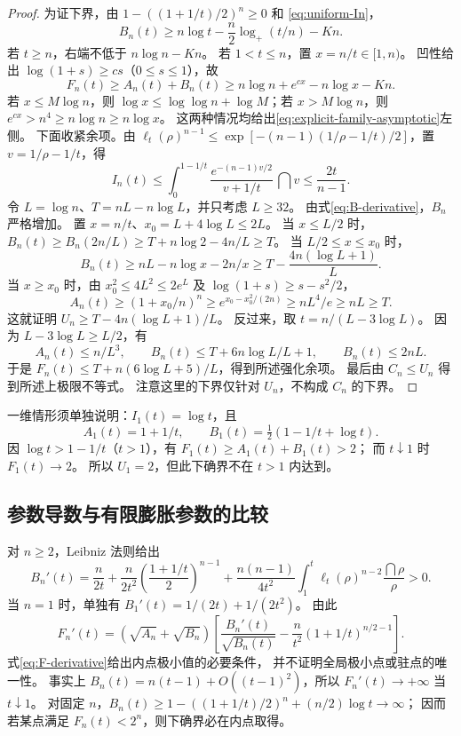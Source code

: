 \begin{proof}
为证下界，由 $1-((1+1/t)/2)^n\ge0$ 和
\eqref{eq:uniform-In}，
\[
 B_n(t)\ge n\log t-\frac n2\log_+(t/n)-Kn.
\]
若 $t\ge n$，右端不低于 $n\log n-Kn$。
若 $1<t\le n$，置 $x=n/t\in[1,n)$。
凹性给出 $\log(1+s)\ge cs$（$0\le s\le1$），故
\[
 F_n(t)\ge A_n(t)+B_n(t)
 \ge n\log n+e^{cx}-n\log x-Kn.
\]
若 $x\le M\log n$，则
$\log x\le\log\log n+\log M$；若 $x>M\log n$，则
$e^{cx}>n^4\ge n\log n\ge n\log x$。
这两种情况均给出\eqref{eq:explicit-family-asymptotic}左侧。
下面收紧余项。由 $\ell_t(\rho)^{n-1}\le
\exp[-(n-1)(1/\rho-1/t)/2]$，置 $v=1/\rho-1/t$，得
\[
 I_n(t)\le\int_0^{1-1/t}
 \frac{e^{-(n-1)v/2}}{v+1/t}\,\dint v
 \le\frac{2t}{n-1}.
\]
令 $L=\log n$、$T=nL-n\log L$，并只考虑 $L\ge32$。
由式\eqref{eq:B-derivative}，$B_n$ 严格增加。
置 $x=n/t$、$x_0=L+4\log L\le2L$。
当 $x\le L/2$ 时，
$B_n(t)\ge B_n(2n/L)\ge T+n\log2-4n/L\ge T$。
当 $L/2\le x\le x_0$ 时，
\[
 B_n(t)\ge nL-n\log x-2n/x
 \ge T-\frac{4n(\log L+1)}L.
\]
当 $x\ge x_0$ 时，由 $x_0^2\le4L^2\le2e^L$ 及
$\log(1+s)\ge s-s^2/2$，
\[
 A_n(t)\ge(1+x_0/n)^n\ge e^{x_0-x_0^2/(2n)}
 \ge nL^4/e\ge nL\ge T.
\]
这就证明 $U_n\ge T-4n(\log L+1)/L$。
反过来，取 $t=n/(L-3\log L)$。
因为 $L-3\log L\ge L/2$，有
\[
 A_n(t)\le n/L^3,\qquad
 B_n(t)\le T+6n\log L/L+1,\qquad B_n(t)\le2nL.
\]
于是 $F_n(t)\le T+n(6\log L+5)/L$，得到所述强化余项。
最后由 $C_n\le U_n$ 得到所述上极限不等式。
注意这里的下界仅针对 $U_n$，不构成 $C_n$ 的下界。
\end{proof}

一维情形须单独说明：$I_1(t)=\log t$，且
\[
 A_1(t)=1+1/t,\qquad B_1(t)=\tfrac12(1-1/t+\log t).
\]
因 $\log t>1-1/t$（$t>1$），有 $F_1(t)\ge A_1(t)+B_1(t)>2$；
而 $t\downarrow1$ 时 $F_1(t)\to2$。
所以 $U_1=2$，但此下确界不在 $t>1$ 内达到。

\subsection{参数导数与有限膨胀参数的比较}
对 $n\ge2$，Leibniz 法则给出
\begin{equation}\label{eq:B-derivative}
 B_n'(t)=\frac n{2t}
 +\frac n{2t^2}\left(\frac{1+1/t}{2}\right)^{n-1}
 +\frac{n(n-1)}{4t^2}\int_1^t
       \ell_t(\rho)^{n-2}\frac{\dint\rho}{\rho}>0.
\end{equation}
当 $n=1$ 时，单独有 $B_1'(t)=1/(2t)+1/(2t^2)$。
由此
\begin{equation}\label{eq:F-derivative}
 F_n'(t)=(\sqrt{A_n}+\sqrt{B_n})
 \left[\frac{B_n'(t)}{\sqrt{B_n(t)}}
 -\frac n{t^2}(1+1/t)^{n/2-1}\right].
\end{equation}
式\eqref{eq:F-derivative}给出内点极小值的必要条件，
并不证明全局极小点或驻点的唯一性。
事实上 $B_n(t)=n(t-1)+O((t-1)^2)$，所以 $F_n'(t)\to+\infty$
当 $t\downarrow1$。
对固定 $n$，$B_n(t)\ge1-((1+1/t)/2)^n+(n/2)\log t\to\infty$；
因而若某点满足 $F_n(t)<2^n$，则下确界必在内点取得。

